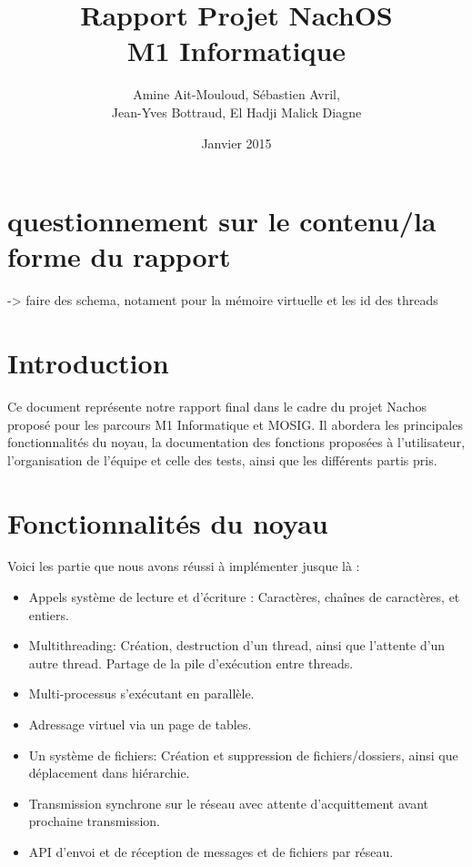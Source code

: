 \documentclass{article}
\begin{document}
\title {Rapport Projet NachOS \\ M1 Informatique}
\author{Amine Ait-Mouloud, Sébastien Avril,\\ Jean-Yves Bottraud, El Hadji Malick Diagne}
\date{Janvier 2015}
\maketitle

\section{questionnement sur le contenu/la forme du rapport}
	 -> faire des schema, notament pour la mémoire virtuelle et les id des threads

\tableofcontents
\newpage
\section{Introduction}
	Ce document représente notre rapport final dans le cadre du projet Nachos proposé pour les parcours M1 Informatique et MOSIG.
	Il abordera les principales fonctionnalités du noyau, la documentation des fonctions proposées à l'utilisateur, l'organisation de l'équipe et celle des tests, ainsi que les différents partis pris.

\section{Fonctionnalités du noyau}
	Voici les partie que nous avons réussi à implémenter jusque là :
	\begin{itemize}
		\item Appels système de lecture et d'écriture : Caractères, chaînes de caractères, et entiers.
		\item Multithreading: Création, destruction d'un thread, ainsi que l'attente d'un autre thread. Partage de la pile d'exécution entre threads.
		\item Multi-processus s'exécutant en parallèle. 
		\item Adressage virtuel via un page de tables.
		\item Un système de fichiers: Création et suppression de fichiers/dossiers, ainsi que déplacement dans hiérarchie.
		\item Transmission synchrone sur le réseau avec attente d'acquittement avant prochaine transmission.
		\item API d'envoi et de réception de messages et de fichiers par réseau. 
	\end{itemize}
\end{document}
